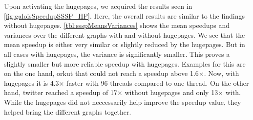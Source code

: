 Upon activating the hugepages, we acquired the results seen in \autoref{fig:galoisSpeedupSSSP_HP}. Here, the overall results are similar to the findings without hugepages. \autoref{tbl:ssspMeansVariances} shows the mean speedups and variances over the different graphs with and without hugepages. We see that the mean speedup is either very similar or slightly reduced by the hugepages. But in all cases with hugepages, the variance is significantly smaller. This proves a slightly smaller but more reliable speedup with hugepages.
Examples for this are on the one hand, orkut that could not reach a speedup above 1.6$\times$. Now, with hugepages it is 4.3$\times$ faster with 96 threads compared to one thread. On the other hand, twitter reached a speedup of 17$\times$ without hugepages and only 13$\times$ with.
While the hugepages did not neccessarily help improve the speedup value, they helped bring the different graphs together. 


